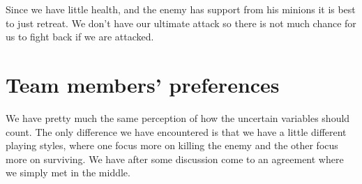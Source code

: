 \documentclass[titlepage]{article}
\begin{document}
Since we have little health, and the enemy has support from his minions it is best to just retreat. We don't have our ultimate attack so there is not much chance for us to fight back if we are attacked. 

\section{Team members' preferences}
We have pretty much the same perception of how the uncertain variables should count. The only difference we have encountered is that we have a little different playing styles, where one focus more on killing the enemy and the other focus more on surviving. We have after some discussion come to an agreement where we simply met in the middle. 
\end{document}
